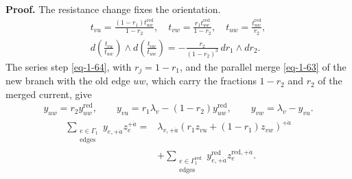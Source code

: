 \documentclass[11pt]{article}
\numberwithin{equation}{section}
\numberwithin{figure}{section}
\numberwithin{table}{section}
\begin{document}
\begin{proofbox}
\textbf{Proof.} The resistance change fixes the orientation.
\begin{equation*}
\begin{gathered}
t_{vu}=\frac{(1-r_1)t_{uw}^{\mathrm{red}}}{1-r_2},\quad
t_{vw}=\frac{r_1t_{uw}^{\mathrm{red}}}{1-r_2},\quad
t_{uw}=\frac{t_{uw}^{\mathrm{red}}}{r_2},\\
d\!\left(\frac{t_{vu}}{t_{uw}}\right)\wedge
 d\!\left(\frac{t_{vw}}{t_{uw}}\right)
=-\frac{r_2}{(1-r_2)^3}\,dr_1\wedge dr_2.
\end{gathered}
\end{equation*}
The series step \eqref{eq-1-64}, with $r_j=1-r_1$, and the parallel merge \eqref{eq-1-63} of the new branch with the old edge $uw$, which carry the fractions $1-r_2$ and $r_2$ of the merged current, give
\begin{equation}\label{b-01151}
\begin{gathered}
y_{uw}=r_2y_{uw}^{\mathrm{red}},\qquad
y_{vu}=r_1\lambda_v-(1-r_2)y_{uw}^{\mathrm{red}},\qquad
y_{vw}=\lambda_v-y_{vu}.
\end{gathered}
\end{equation}
\begin{equation*}
\begin{aligned}
\sum_{\substack{e\in\Gamma_1\\\mathrm{edges}}}y_{e,+\dot a}z_e^{+\dot a}
={}&\lambda_{v,+\dot a}(r_1z_{vu}+(1-r_1)z_{vw})^{+\dot a}\\
&+\sum_{\substack{e\in\Gamma_1^{\mathrm{red}}\\\mathrm{edges}}}
y_{e,+\dot a}^{\mathrm{red}}z_e^{\mathrm{red},+\dot a}.
\end{aligned}
\end{equation*}


\end{proofbox}
\end{document}
